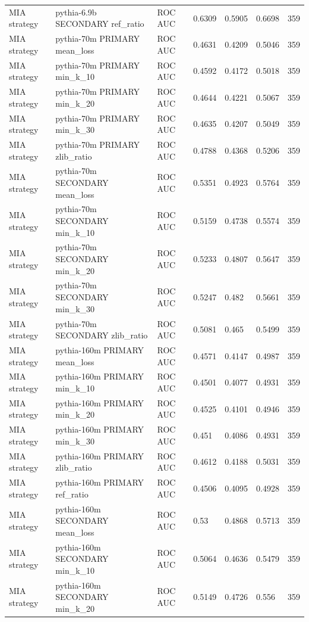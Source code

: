 \begin{tabular}{lllllll}
MIA strategy & pythia-6.9b SECONDARY ref\_ratio & ROC AUC & 0.6309 & 0.5905 & 0.6698 & 359 \\
MIA strategy & pythia-70m PRIMARY mean\_loss & ROC AUC & 0.4631 & 0.4209 & 0.5046 & 359 \\
MIA strategy & pythia-70m PRIMARY min\_k\_10 & ROC AUC & 0.4592 & 0.4172 & 0.5018 & 359 \\
MIA strategy & pythia-70m PRIMARY min\_k\_20 & ROC AUC & 0.4644 & 0.4221 & 0.5067 & 359 \\
MIA strategy & pythia-70m PRIMARY min\_k\_30 & ROC AUC & 0.4635 & 0.4207 & 0.5049 & 359 \\
MIA strategy & pythia-70m PRIMARY zlib\_ratio & ROC AUC & 0.4788 & 0.4368 & 0.5206 & 359 \\
MIA strategy & pythia-70m SECONDARY mean\_loss & ROC AUC & 0.5351 & 0.4923 & 0.5764 & 359 \\
MIA strategy & pythia-70m SECONDARY min\_k\_10 & ROC AUC & 0.5159 & 0.4738 & 0.5574 & 359 \\
MIA strategy & pythia-70m SECONDARY min\_k\_20 & ROC AUC & 0.5233 & 0.4807 & 0.5647 & 359 \\
MIA strategy & pythia-70m SECONDARY min\_k\_30 & ROC AUC & 0.5247 & 0.482 & 0.5661 & 359 \\
MIA strategy & pythia-70m SECONDARY zlib\_ratio & ROC AUC & 0.5081 & 0.465 & 0.5499 & 359 \\
MIA strategy & pythia-160m PRIMARY mean\_loss & ROC AUC & 0.4571 & 0.4147 & 0.4987 & 359 \\
MIA strategy & pythia-160m PRIMARY min\_k\_10 & ROC AUC & 0.4501 & 0.4077 & 0.4931 & 359 \\
MIA strategy & pythia-160m PRIMARY min\_k\_20 & ROC AUC & 0.4525 & 0.4101 & 0.4946 & 359 \\
MIA strategy & pythia-160m PRIMARY min\_k\_30 & ROC AUC & 0.451 & 0.4086 & 0.4931 & 359 \\
MIA strategy & pythia-160m PRIMARY zlib\_ratio & ROC AUC & 0.4612 & 0.4188 & 0.5031 & 359 \\
MIA strategy & pythia-160m PRIMARY ref\_ratio & ROC AUC & 0.4506 & 0.4095 & 0.4928 & 359 \\
MIA strategy & pythia-160m SECONDARY mean\_loss & ROC AUC & 0.53 & 0.4868 & 0.5713 & 359 \\
MIA strategy & pythia-160m SECONDARY min\_k\_10 & ROC AUC & 0.5064 & 0.4636 & 0.5479 & 359 \\
MIA strategy & pythia-160m SECONDARY min\_k\_20 & ROC AUC & 0.5149 & 0.4726 & 0.556 & 359 \\

\end{tabular}

